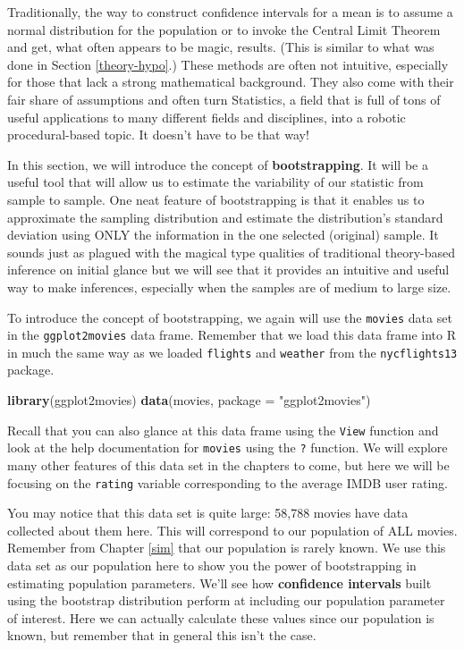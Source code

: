 \documentclass[]{tufte-book}
\newenvironment{Shaded}{\begin{snugshade}}{\end{snugshade}}
\newcommand{\KeywordTok}[1]{\textcolor[rgb]{0.13,0.29,0.53}{\textbf{{#1}}}}
\newcommand{\DataTypeTok}[1]{\textcolor[rgb]{0.13,0.29,0.53}{{#1}}}
\newcommand{\StringTok}[1]{\textcolor[rgb]{0.31,0.60,0.02}{{#1}}}
\newcommand{\NormalTok}[1]{{#1}}
\theoremstyle{definition}
\theoremstyle{definition}
\theoremstyle{remark}
\begin{document}
Traditionally, the way to construct confidence intervals for a mean is
to assume a normal distribution for the population or to invoke the
Central Limit Theorem and get, what often appears to be magic, results.
(This is similar to what was done in Section \ref{theory-hypo}.) These
methods are often not intuitive, especially for those that lack a strong
mathematical background. They also come with their fair share of
assumptions and often turn Statistics, a field that is full of tons of
useful applications to many different fields and disciplines, into a
robotic procedural-based topic. It doesn't have to be that way!

In this section, we will introduce the concept of
\textbf{bootstrapping}. It will be a useful tool that will allow us to
estimate the variability of our statistic from sample to sample. One
neat feature of bootstrapping is that it enables us to approximate the
sampling distribution and estimate the distribution's standard deviation
using ONLY the information in the one selected (original) sample. It
sounds just as plagued with the magical type qualities of traditional
theory-based inference on initial glance but we will see that it
provides an intuitive and useful way to make inferences, especially when
the samples are of medium to large size.

To introduce the concept of bootstrapping, we again will use the
\texttt{movies} data set in the \texttt{ggplot2movies} data frame.
Remember that we load this data frame into R in much the same way as we
loaded \texttt{flights} and \texttt{weather} from the
\texttt{nycflights13} package.

\begin{Shaded}
\begin{Highlighting}[]
\KeywordTok{library}\NormalTok{(ggplot2movies)}
\KeywordTok{data}\NormalTok{(movies, }\DataTypeTok{package =} \StringTok{"ggplot2movies"}\NormalTok{)}
\end{Highlighting}
\end{Shaded}

Recall that you can also glance at this data frame using the
\texttt{View} function and look at the help documentation for
\texttt{movies} using the \texttt{?} function. We will explore many
other features of this data set in the chapters to come, but here we
will be focusing on the \texttt{rating} variable corresponding to the
average IMDB user rating.

You may notice that this data set is quite large: 58,788 movies have
data collected about them here. This will correspond to our population
of ALL movies. Remember from Chapter \ref{sim} that our population is
rarely known. We use this data set as our population here to show you
the power of bootstrapping in estimating population parameters. We'll
see how \textbf{confidence intervals} built using the bootstrap
distribution perform at including our population parameter of interest.
Here we can actually calculate these values since our population is
known, but remember that in general this isn't the case.
\end{document}
